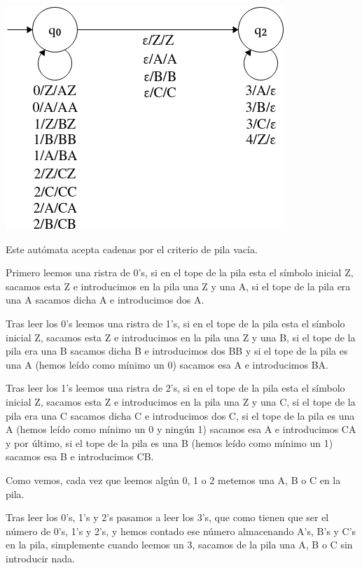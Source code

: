 \documentclass[12pt, spanish]{article}
\begin{document}
\begin{center}
\includegraphics[scale=0.55]{pila_1.png}
\end{center}

Este autómata acepta cadenas por el criterio de pila vacía.

Primero leemos una ristra de 0's, si en el tope de la pila esta el símbolo inicial Z, sacamos esta Z e introducimos en la pila una Z y una A, si el tope de la pila era una A sacamos dicha A e introducimos dos A.

Tras leer los 0's leemos una ristra de 1's, si en el tope de la pila esta el símbolo inicial Z, sacamos esta Z e introducimos en la pila una Z y una B, si el tope de la pila era una B sacamos dicha B e introducimos dos BB y si el tope de la pila es una A (hemos leído como mínimo un 0) sacamos esa A e introducimos BA.

Tras leer los 1's leemos una ristra de 2's, si en el tope de la pila esta el símbolo inicial Z, sacamos esta Z e introducimos en la pila una Z y una C, si el tope de la pila era una C sacamos dicha C e introducimos dos C, si el tope de la pila es una A (hemos leído como mínimo un 0 y ningún 1) sacamos esa A e introducimos CA y por último, si el tope de la pila es una B (hemos leído como mínimo un 1) sacamos esa B e introducimos CB.

Como vemos, cada vez que leemos algún 0, 1 o 2 metemos una A, B o C en la pila.

Tras leer los 0's, 1's y 2's pasamos a leer los 3's, que como tienen que ser el número de 0's, 1's y 2's, y hemos contado ese número almacenando A's, B's y C's en la pila, simplemente cuando leemos un 3, sacamos de la pila una A, B o C sin introducir nada.
\end{document}
